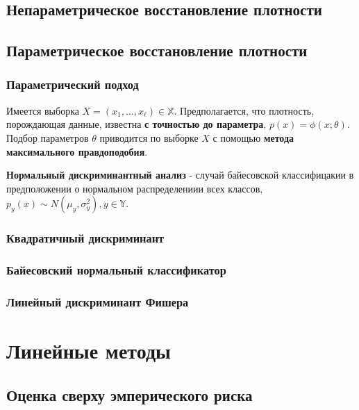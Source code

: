 \documentclass{beamer}
\begin{document}
	\subsection{Непараметрическое восстановление плотности}
	
	
	\subsection{Параметрическое восстановление плотности}
	
	\begin{frame}
		\frametitle{Параметрический подход}
		Имеется выборка $X = (x_1, ..., x_{\ell}) \in \mathbb{X}$. Предполагается, что плотность, порождающая данные, известна \textbf{с точностью до параметра}, $p(x) = \phi(x; \theta)$. Подбор параметров $\theta$ приводится по выборке $X$ с помощью \textbf{метода максимального правдоподобия}.
		
		\vspace{15pt}
		
		\textbf{Нормальный дискриминантный анализ} - случай байесовской классифицакии в предположении о нормальном распределениии всех классов, $p_y(x) \sim N(\mu_y, \sigma_y^2), y \in \mathbb{Y}$.
	\end{frame}
	
	\begin{frame}
		\frametitle{Квадратичный дискриминант}
	\end{frame}
	
	\begin{frame}
		\frametitle{Байесовский нормальный классификатор}
	\end{frame}
	
	\begin{frame}
		\frametitle{Линейный дискриминант Фишера}
	\end{frame}
	
	\section{Линейные методы}
	\subsection{Оценка сверху эмперического риска}
	
\end{document}
